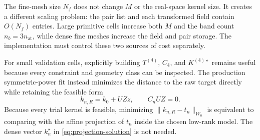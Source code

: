 \documentclass{article}
\newcommand{\Nf}{N_f}
\begin{document}
The fine-mesh size $\Nf$ does not change $M$ or the real-space kernel size.
It creates a different scaling problem: the pair list and each transformed
field contain $O(\Nf)$ entries. Large primitive cells increase both
$M$ and the band count $n_b=3n_{\mathrm{at}}$, while dense fine meshes
increase the field and pair storage. The implementation must control these
two sources of cost separately.

For small validation cells, explicitly building $T^{(4)}$, $C_4$, and
$K^{(4)\star}$ remains useful because every constraint and geometry class
can be inspected. The production symmetric-power fit instead minimizes
the distance to the raw target directly while retaining the feasible form
\begin{equation}
    k_{n,R}=k_0+UZz,
    \qquad C_nUZ=0.
    \label{eq:matrixfree-feasible-form}
\end{equation}
Because every trial kernel is feasible, minimizing
$\|k_{n,R}-t_n\|_{W_n}$ is equivalent to comparing with the affine
projection of $t_n$ inside the chosen low-rank model. The dense vector
$k_n^\star$ in \autoref{eq:projection-solution} is not needed.
\end{document}
